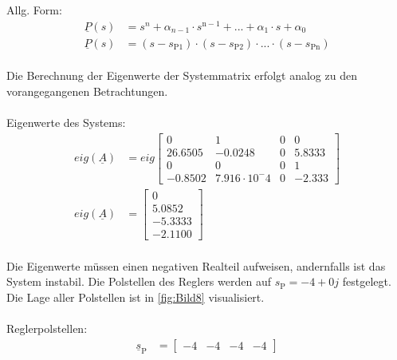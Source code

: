 \documentclass[
	pagesize,
	fontsize=12pt,
	paper=a4,
	oneside,
   reqno
]{scrartcl}
\begin{document}
Allg. Form:
\begin{align*}
        \underline{P}(s) &= s^n+\alpha_{n-1}\cdot s^{\mathrm{n-1}}+...+\alpha_{\mathrm{1}}\cdot s + \alpha_{\mathrm{0}} \\
        \underline{P}(s) &= (s-s_{\mathrm{P1}})\cdot(s-s_{\mathrm{P2}})\cdot ... \cdot (s-s_{\mathrm{Pn}})
\end{align*}\\
Die Berechnung der Eigenwerte der Systemmatrix erfolgt analog zu den vorangegangenen Betrachtungen.\\\\
Eigenwerte des Systems:
\begin{align}
    eig(\underline{A}) &= eig
    \begin{bmatrix}
        0 & 1 & 0 & 0 \\
        26.6505 & -0.0248 & 0 & 5.8333 \\
        0 & 0 & 0 & 1 \\
        -0.8502 & 7.916\cdot10^-4 & 0 & -2.333
    \end{bmatrix} \nonumber\\
    eig(\underline{A}) &=
    \begin{bmatrix}
        0 \\
        5.0852 \\
        -5.3333 \\
        -2.1100
    \end{bmatrix}
\end{align}\\
Die Eigenwerte müssen einen negativen Realteil aufweisen, andernfalls ist das System instabil. Die Polstellen des Reglers werden auf $s_{\mathrm{P}} = -4+0j$ festgelegt. Die Lage aller Polstellen ist in \autoref{fig:Bild8} visualisiert.\\\\
Reglerpolstellen:
\begin{align}
    \underline{s}_{\mathrm{P}} &= 
    \begin{bmatrix}
        -4 & -4 & -4 & -4 
    \end{bmatrix}
\end{align}
\end{document}
